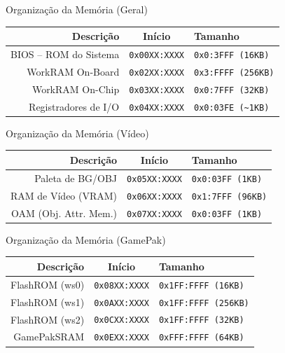 \documentclass{beamer}
\begin{document}
\begin{darkframes}
    \begin{frame}{Organização da Memória (Geral)}
        \begin{center}
            \begin{tabular}{|r|c|l|}
                \hline
                Descrição              & Início               & Tamanho \\\hline
                BIOS -- ROM do Sistema & \texttt{0x00XX:XXXX} & \texttt{0x0:3FFF (16KB)} \\\hline
                WorkRAM On-Board       & \texttt{0x02XX:XXXX} & \texttt{0x3:FFFF (256KB)} \\\hline
                WorkRAM On-Chip        & \texttt{0x03XX:XXXX} & \texttt{0x0:7FFF (32KB)} \\\hline
                Registradores de I/O   & \texttt{0x04XX:XXXX} & \texttt{0x0:03FE (\textasciitilde1KB)} \\\hline
            \end{tabular}
        \end{center}
    \end{frame}

    \begin{frame}{Organização da Memória (Vídeo)}
        \begin{center}
            \begin{tabular}{|r|c|l|}
                \hline
                Descrição             & Início               & Tamanho \\\hline
                Paleta de BG/OBJ      & \texttt{0x05XX:XXXX} & \texttt{0x0:03FF (1KB)} \\\hline
                RAM de Vídeo (VRAM)   & \texttt{0x06XX:XXXX} & \texttt{0x1:7FFF (96KB)} \\\hline
                OAM (Obj. Attr. Mem.) & \texttt{0x07XX:XXXX} & \texttt{0x0:03FF (1KB)} \\\hline
            \end{tabular}
        \end{center}
    \end{frame}

    \begin{frame}{Organização da Memória (GamePak)}
        \begin{center}
            \begin{tabular}{|r|c|l|}
                \hline
                Descrição      & Início               & Tamanho \\\hline
                FlashROM (ws0) & \texttt{0x08XX:XXXX} & \texttt{0x1FF:FFFF (16KB)} \\\hline
                FlashROM (ws1) & \texttt{0x0AXX:XXXX} & \texttt{0x1FF:FFFF (256KB)} \\\hline
                FlashROM (ws2) & \texttt{0x0CXX:XXXX} & \texttt{0x1FF:FFFF (32KB)} \\\hline
                GamePakSRAM    & \texttt{0x0EXX:XXXX} & \texttt{0xFFF:FFFF (64KB)} \\\hline
            \end{tabular}
        \end{center}
    \end{frame}


\end{darkframes}
\end{document}
